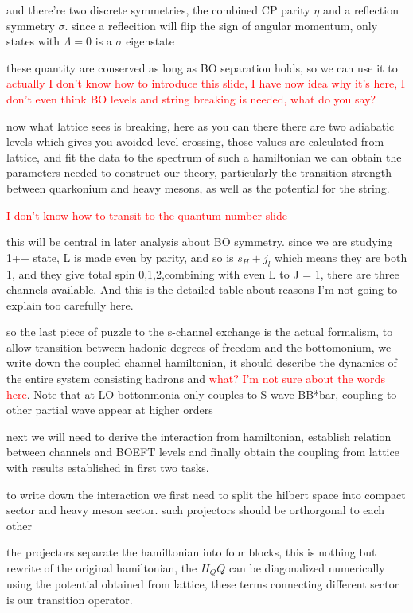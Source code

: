 \documentclass[11pt]{article}
\begin{document}
and there're two discrete symmetries, the combined CP parity $\eta$ and a reflection symmetry $\sigma$. since a reflecition will flip the sign of angular momentum, only states with $\Lambda=0$ is a $\sigma$ eigenstate

these quantity are conserved as long as BO separation holds, so we can use it to \textcolor{red}{actually I don't know how to  introduce this slide, I have now idea why it's here, I don't even think BO levels and string breaking is needed, what do you say?}

now what lattice sees is breaking, here as you can there there are two adiabatic levels which gives you avoided level crossing, those values are calculated from lattice, and fit the data to the spectrum of such a hamiltonian we can obtain the parameters needed to construct our theory, particularly the transition strength between quarkonium and heavy mesons, as well as the potential for the string.

\textcolor{red}{ I don't know how to transit to the quantum number slide}

this will be central in later analysis about BO symmetry. since we are studying 1++ state, L is made even by parity, and so is $s_H + j_l$ which means they are both 1, and they give total spin 0,1,2,combining with even L to J = 1, there  are three channels available. And this is the detailed table about reasons I'm not going to explain too carefully here.

so the last piece of puzzle to the s-channel exchange is the actual formalism, to allow transition between hadonic degrees of freedom and the bottomonium, we write down the coupled channel hamiltonian, it should describe the dynamics of the entire system consisting hadrons and \textcolor{red}{what? I'm not sure about the words here}. Note that at LO bottonmonia only couples to S wave BB*bar, coupling to other partial wave appear at higher orders

next we will need to derive the interaction from hamiltonian, establish relation between \BOchiEFT channels and BOEFT levels and finally obtain the coupling from lattice with results established in first two tasks.

to write down the interaction we first need to split the hilbert space into compact sector and heavy meson sector. such projectors should be orthorgonal to each other

the projectors separate the hamiltonian into four blocks, this is nothing but rewrite of the original hamiltonian, the $H_QQ$ can be diagonalized numerically using the potential obtained from lattice, these terms connecting different sector is our transition operator.
\end{document}
